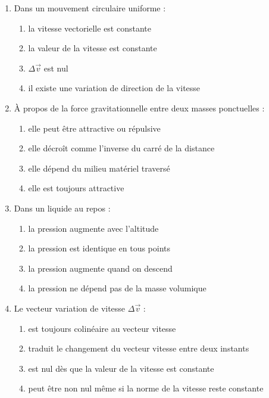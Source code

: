 \documentclass[11pt,a4paper]{article}
\begin{document}
\begin{enumerate}[label=\textbf{QCM \arabic*.},leftmargin=*]
\begin{enumerate}[label=\alph*)]
\item peut dépasser 1 si le convertisseur est performant
\item compare une grandeur utile à une grandeur reçue
\item s'exprime souvent en pourcentage
\end{enumerate}
\item Dans un mouvement circulaire uniforme :
\begin{enumerate}[label=\alph*)]
\item la vitesse vectorielle est constante
\item la valeur de la vitesse est constante
\item $\Delta\vec v$ est nul
\item il existe une variation de direction de la vitesse
\end{enumerate}
\item À propos de la force gravitationnelle entre deux masses ponctuelles :
\begin{enumerate}[label=\alph*)]
\item elle peut être attractive ou répulsive
\item elle décroît comme l'inverse du carré de la distance
\item elle dépend du milieu matériel traversé
\item elle est toujours attractive
\end{enumerate}
\item Dans un liquide au repos :
\begin{enumerate}[label=\alph*)]
\item la pression augmente avec l'altitude
\item la pression est identique en tous points
\item la pression augmente quand on descend
\item la pression ne dépend pas de la masse volumique
\end{enumerate}
\item Le vecteur variation de vitesse $\Delta \vec v$ :
\begin{enumerate}[label=\alph*)]
\item est toujours colinéaire au vecteur vitesse
\item traduit le changement du vecteur vitesse entre deux instants
\item est nul dès que la valeur de la vitesse est constante
\item peut être non nul même si la norme de la vitesse reste constante
\end{enumerate}

\end{enumerate}
\end{document}
